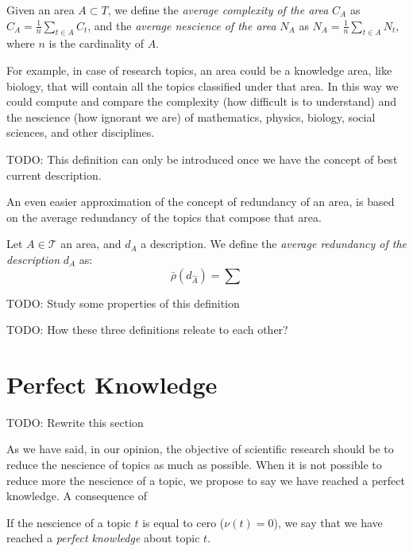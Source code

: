 \begin{definition}
Given an area $A\subset T$, we define the \emph{average complexity of the area} $C_{A}$ as $C_{A}=\frac{1}{n}\sum_{t\in A}C_{t}$, and the \emph{average nescience of the area} $N_{A}$ as $N_{A}=\frac{1}{n}\sum_{t\in A}N_{t}$, where $n$ is the cardinality of $A$.
\end{definition}

For example, in case of research topics, an area could be a knowledge area, like biology, that will contain all the topics classified under that area. In this way we could compute and compare the complexity (how difficult is to understand) and the nescience (how ignorant we are) of mathematics, physics, biology, social sciences, and other disciplines.

{\color{red} TODO: This definition can only be introduced once we have the concept of best current description.}

An even easier approximation of the concept of redundancy of an area, is based on the average redundancy of the topics that compose that area.

\begin{definition}
Let $A \in \mathcal{T}$ an area, and $d_A$ a description. We define the \emph{average redundancy of the description} $d_A$ as:
\[
\bar{\rho}(d_{\hat{A}}) = \sum
\]
\end{definition}

{\color{red} TODO: Study some properties of this definition}

{\color{red} TODO: How these three definitions releate to each other?}


%
%

\section{Perfect Knowledge}
\label{sec:perfect_knowledge}

{\color{red} TODO: Rewrite this section}

As we have said, in our opinion, the objective of scientific research should be to reduce the nescience of topics as much as possible. When it is not possible to reduce more the nescience of a topic, we propose to say we have reached a perfect knowledge. A consequence of 

\begin{definition}
If the nescience of a topic $t$ is equal to cero ($\nu(t)=0$), we say that we have reached a \emph{perfect knowledge} about topic $t$.
\end{definition}

